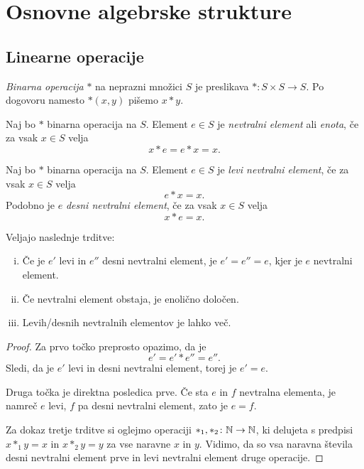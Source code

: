 \section{Osnovne algebrske strukture}

\subsection{Linearne operacije}

\begin{definicija}
\emph{Binarna operacija} $*$ na neprazni
množici $S$ je preslikava $*\colon S\times S\to S$. Po dogovoru
namesto $*(x,y)$ pišemo $x*y$.
\end{definicija}

\begin{definicija}
Naj bo $*$ binarna operacija na $S$. Element $e\in S$ je
\emph{nevtralni element}
ali \emph{enota}, če za vsak $x\in S$ velja
\[
x*e=e*x=x.
\]
\end{definicija}

\begin{definicija}
Naj bo $*$ binarna operacija na $S$. Element $e\in S$ je \emph{levi
nevtralni element}, če za vsak $x\in S$ velja
\[
e*x=x.
\]
Podobno je $e$ \emph{desni nevtralni element}, če za vsak $x\in S$
velja
\[
x*e=x.
\]
\end{definicija}

\begin{trditev}
Veljajo naslednje trditve:

\begin{enumerate}[i)]
\item Če je $e'$ levi in $e''$ desni nevtralni element, je
$e'=e''=e$, kjer je $e$ nevtralni element.
\item Če nevtralni element obstaja, je enolično določen.
\item Levih/desnih nevtralnih elementov je lahko več.
\end{enumerate}
\end{trditev}

\begin{proof}
Za prvo točko preprosto opazimo, da je
\[
e'=e'*e''=e''.
\]
Sledi, da je $e'$ levi in desni nevtralni element, torej je $e'=e$.

Druga točka je direktna posledica prve. Če sta $e$ in $f$ nevtralna
elementa, je namreč $e$ levi, $f$ pa desni nevtralni element, zato
je $e=f$.

Za dokaz tretje trditve si oglejmo operaciji
$*_1,*_2\colon\mathbb{N}\to\mathbb{N}$, ki delujeta s predpisi $x*_1y=x$ in
$x*_2y=y$ za vse naravne $x$ in $y$. Vidimo, da so vsa naravna
števila desni nevtralni element prve in levi nevtralni element
druge operacije.
\end{proof}

